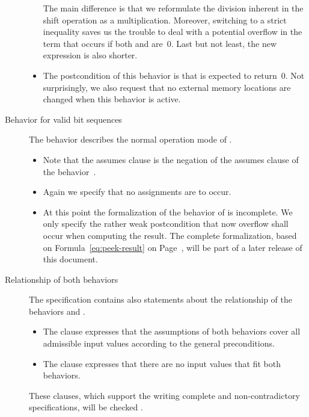 \begin{description}
\begin{itemize}
The main difference is that we reformulate the division inherent in the shift
operation as a multiplication.
Moreover, switching to a strict inequality saves us the trouble
to deal with a potential overflow in the term 
that occurs if both  and  are~0.
Last but not least, the new expression is also shorter.

\item
The postcondition of this behavior is that \peek is expected to return~0.
Not surprisingly, we also request that no external memory locations are
changed when this behavior is active.

\end{itemize}

\item[Behavior for valid bit sequences]

The behavior  describes the normal operation mode of \peek.
\begin{itemize}
\item
Note that the assumes clause is the negation of the assumes clause  of
the behavior~.

\item
Again we specify that no assignments are to occur.

\item 
At this point the formalization of the behavior of \peek is incomplete.
We only specify the rather weak postcondition that now overflow shall occur
when computing the result.
The complete formalization, based on Formula~\eqref{eq:peek-result}
on Page~\pageref{eq:peek-result}, will be part of a later release of this document.
\end{itemize}

\item[Relationship of both behaviors]

The specification contains also statements about the relationship
of the behaviors  and .

\begin{itemize}
\item
The clause  expresses that
the assumptions of both behaviors cover all admissible 
input values according to the general preconditions.

\item
The clause  expresses
that there are no input values that fit both 
behaviors.
\end{itemize}

These clauses, which support the writing complete and non-contradictory specifications,
will be checked \framacwp.
\end{description}

